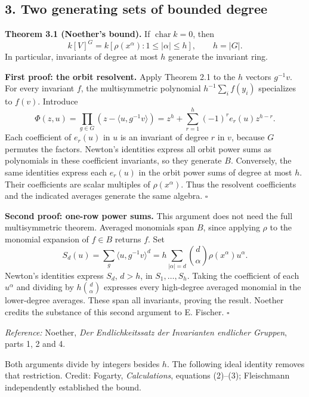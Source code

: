 \documentclass[
]{article}
\begin{document}
\subsection{3. Two generating sets of bounded
degree}\label{two-generating-sets-of-bounded-degree}

\protect{}\label{theorem-3-1}{}

\textbf{Theorem 3.1 (Noether's bound).} If \(\operatorname{char}k=0\),
then \[
k [V]^G=k [\rho(x^\alpha):1\leq|\alpha|\leq h],\qquad h=|G|.
\] In particular, invariants of degree at most \(h\) generate the
invariant ring.

\textbf{First proof: the orbit resolvent.} Apply Theorem 2.1 to the
\(h\) vectors \(g^{-1}v\). For every invariant \(f\), the multisymmetric
polynomial \(h^{-1}\sum_i f(y_i)\) specializes to \(f(v)\). Introduce \[
\Phi(z,u)=\prod_{g\in G}(z-\langle u,g^{-1}v\rangle)
=z^h+\sum_{r=1}^h(-1)^re_r(u)z^{h-r}.
\] Each coefficient of \(e_r(u)\) in \(u\) is an invariant of degree
\(r\) in \(v\), because \(G\) permutes the factors. Newton's identities
express all orbit power sums as polynomials in these coefficient
invariants, so they generate \(B\). Conversely, the same identities
express each \(e_r(u)\) in the orbit power sums of degree at most \(h\).
Their coefficients are scalar multiples of \(\rho(x^\alpha)\). Thus the
resolvent coefficients and the indicated averages generate the same
algebra. \(\square\)

\textbf{Second proof: one-row power sums.} This argument does not need
the full multisymmetric theorem. Averaged monomials span \(B\), since
applying \(\rho\) to the monomial expansion of \(f\in B\) returns \(f\).
Set \[
S_d(u)=\sum_g\langle u,g^{-1}v\rangle^d
=h\sum_{|\alpha|=d}\binom d\alpha\rho(x^\alpha)u^\alpha.
\] Newton's identities express \(S_d\), \(d>h\), in \(S_1,\ldots,S_h\).
Taking the coefficient of each \(u^\alpha\) and dividing by
\(h\binom d\alpha\) expresses every high-degree averaged monomial in the
lower-degree averages. These span all invariants, proving the result.
Noether credits the substance of this second argument to E. Fischer.
\(\square\)

\emph{Reference:} Noether, \emph{Der Endlichkeitssatz der Invarianten
endlicher Gruppen}, parts 1, 2 and 4.

Both arguments divide by integers besides \(h\). The following ideal
identity removes that restriction. Credit: Fogarty, \emph{Calculations},
equations (2)--(3); Fleischmann independently established the bound.
\end{document}

